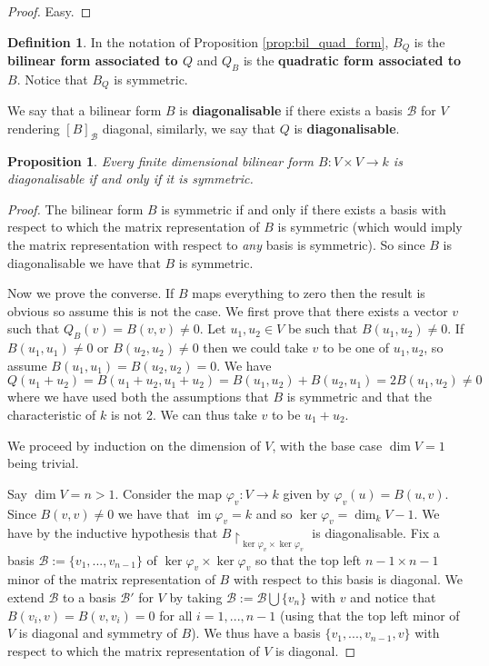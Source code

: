 \documentclass[12pt]{article}
\theoremstyle{plain}
\newtheorem{proposition}[thm]{Proposition}
\theoremstyle{definition}
\newtheorem{defn}[thm]{Definition} %
\newcommand{\scr}[1]{\mathscr{#1}}
\newcommand{\lto}{\longrightarrow}
\begin{document}
\begin{proof}
Easy.
\end{proof}
\begin{defn}\label{def:associated_forms}
In the notation of Proposition \ref{prop:bil_quad_form}, $B_Q$ is the \textbf{bilinear form associated to $Q$} and $Q_B$ is the \textbf{quadratic form associated to $B$}. Notice that $B_Q$ is symmetric.

We say that a bilinear form $B$ is \textbf{diagonalisable} if there exists a basis $\scr{B}$ for $V$ rendering $[B]_{\scr{B}}$ diagonal, similarly, we say that $Q$ is \textbf{diagonalisable}.

\end{defn}
\begin{proposition}\label{prop:diagonalisable_symmetric}
Every finite dimensional bilinear form $B: V \times V \lto k$ is diagonalisable if and only if it is symmetric.
\end{proposition}
\begin{proof}
The bilinear form $B$ is symmetric if and only if there exists a basis with respect to which the matrix representation of $B$ is symmetric (which would imply the matrix representation with respect to \emph{any} basis is symmetric). So since $B$ is diagonalisable we have that $B$ is symmetric.

Now we prove the converse. If $B$ maps everything to zero then the result is obvious so assume this is not the case. We first prove that there exists a vector $v$ such that $Q_B(v) = B(v,v) \neq 0$. Let $u_1,u_2 \in V$ be such that $B(u_1,u_2) \neq 0$. If $B(u_1,u_1) \neq 0$ or $B(u_2,u_2) \neq 0$ then we could take $v$ to be one of $u_1,u_2$, so assume $B(u_1,u_1) = B(u_2,u_2) = 0$. We have
\begin{equation}
Q(u_1 + u_2) = B(u_1 + u_2, u_1 + u_2) = B(u_1,u_2) + B(u_2,u_1) = 2B(u_1,u_2) \neq 0
\end{equation}
where we have used both the assumptions that $B$ is symmetric and that the characteristic of $k$ is not 2. We can thus take $v$ to be $u_1 + u_2$.

We proceed by induction on the dimension of $V$, with the base case $\operatorname{dim}V = 1$ being trivial.

Say $\operatorname{dim}V = n > 1$. Consider the map $\varphi_v: V \lto k$ given by $\varphi_v(u) = B(u,v)$. Since $B(v,v) \neq 0$ we have that $\operatorname{im}\varphi_v = k$ and so $\operatorname{ker}\varphi_v = \operatorname{dim}_kV - 1$. We have by the inductive hypothesis that $B\restriction_{\operatorname{ker}\varphi_v \times \operatorname{ker}\varphi_v}$ is diagonalisable. Fix a basis $\scr{B} := \lbrace v_1,...,v_{n-1}\rbrace$ of $\operatorname{ker}\varphi_v \times \operatorname{ker}\varphi_v$ so that the top left $n-1 \times n-1$ minor of the matrix representation of $B$ with respect to this basis is diagonal. We extend $\scr{B}$ to a basis $\scr{B}'$ for $V$ by taking $\scr{B} := \scr{B} \bigcup \lbrace v_n\rbrace$ with $v$ and notice that $B(v_i,v) = B(v,v_i) = 0$ for all $i = 1,...,n-1$ (using that the top left minor of $V$ is diagonal and symmetry of $B$). We thus have a basis $\lbrace v_1,...,v_{n-1},v\rbrace$ with respect to which the matrix representation of $V$ is diagonal.
\end{proof}
\end{document}
